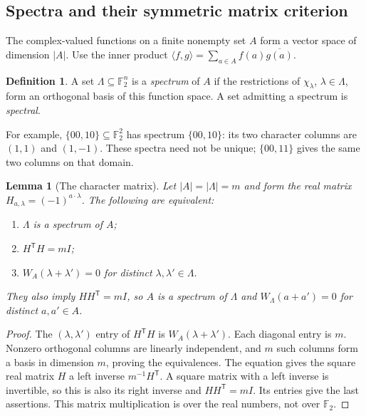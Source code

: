 \documentclass[11pt]{article}
\numberwithin{equation}{section}
\newtheorem{lemma}[theorem]{Lemma}
\theoremstyle{definition}
\newtheorem{definition}[theorem]{Definition}
\theoremstyle{remark}\newtheorem{remark}[theorem]{Remark}
\newcommand{\F}{\mathbb F_2}
\begin{document}
\subsection{Spectra and their symmetric matrix criterion}
The complex-valued functions on a finite nonempty set $A$ form a vector space of dimension $|A|$. Use the inner product $\langle f,g\rangle=\sum_{a\in A}f(a)\overline{g(a)}$.
\begin{definition}
A set $\Lambda\subseteq\F^n$ is a \emph{spectrum} of $A$ if the restrictions of $\chi_\lambda$, $\lambda\in\Lambda$, form an orthogonal basis of this function space. A set admitting a spectrum is \emph{spectral}.
\end{definition}
For example, $\{00,10\}\subseteq\F^2$ has spectrum $\{00,10\}$: its two character columns are $(1,1)$ and $(1,-1)$. These spectra need not be unique; $\{00,11\}$ gives the same two columns on that domain.

\begin{lemma}[The character matrix]\label{lem:spectral}
Let $|A|=|\Lambda|=m$ and form the real matrix $H_{a,\lambda}=(-1)^{a\cdot\lambda}$. The following are equivalent:
\begin{enumerate}
\item $\Lambda$ is a spectrum of $A$;
\item $H^{\mathsf T}H=mI$;
\item $W_A(\lambda+\lambda')=0$ for distinct $\lambda,\lambda'\in\Lambda$.
\end{enumerate}
They also imply $HH^{\mathsf T}=mI$, so $A$ is a spectrum of $\Lambda$ and $W_\Lambda(a+a')=0$ for distinct $a,a'\in A$.
\end{lemma}
\begin{proof}
The $(\lambda,\lambda')$ entry of $H^{\mathsf T}H$ is $W_A(\lambda+\lambda')$. Each diagonal entry is $m$. Nonzero orthogonal columns are linearly independent, and $m$ such columns form a basis in dimension $m$, proving the equivalences. The equation gives the square real matrix $H$ a left inverse $m^{-1}H^{\mathsf T}$. A square matrix with a left inverse is invertible, so this is also its right inverse and $HH^{\mathsf T}=mI$. Its entries give the last assertions. This matrix multiplication is over the real numbers, not over $\F$.
\end{proof}
\end{document}
